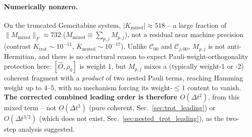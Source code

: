 \documentclass[11pt]{article}
\newcommand{\Dt}{\Delta t}
\newcommand{\calC}{\mathcal{C}}
\begin{document}
\paragraph{Numerically nonzero.} On the truncated Gemcitabine system, $|K_{\text{mixed}}|\approx518$ -- a large fraction of $\|M_{\text{mixed}}\|_F\approx732$ ($M_{\text{mixed}}\equiv\sum_{p,j}M_{p,j}$), not a residual near machine precision (contrast $K_{\text{trot}}\sim10^{-11}$, $K_{\text{nested}}\sim10^{-17}$). Unlike $\calC_{00}$ and $\calC_{j,00}$, $M_{p,j}$ is not anti-Hermitian, and there is no structural reason to expect Pauli-weight-orthogonality protection here: $[\hat{O},\rho_0]$ is weight 1, but $M_{p,j}$ mixes a (typically weight-1 or -2) coherent fragment with a \emph{product} of two nested Pauli terms, reaching Hamming weight up to 4--5, with no mechanism forcing its weight-$\le\!1$ content to vanish. \textbf{The corrected combined leading order is therefore $O(\Dt^2)$}, from this mixed term -- not $O(\Dt^3)$ (pure coherent, Sec.~\ref{sec:trot_leading}) or $O(\Dt^{3/2})$ (which does not exist, Sec.~\ref{sec:nested_trot_leading}), as the two-step analysis suggested.
\end{document}
